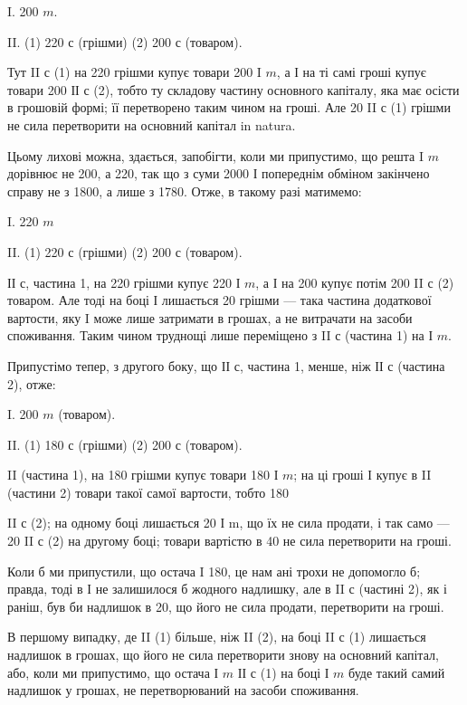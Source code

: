 
I.    200 $m$.

II. (1) 220 $с$ (грішми) \dplus{} (2) 200 $с$ (товаром).

Тут II $с$ (1) на 220 грішми купує товари 200 I $m$, а І на
ті самі гроші купує товари 200 ІІ $с$ (2), тобто ту складову частину
основного капіталу, яка має осісти в грошовій формі; її перетворено
таким чином на гроші. Але 20 II $с$ (1) грішми не сила перетворити на
основний капітал in natura.

Цьому лихові можна, здається, запобігти, коли ми припустимо, що решта
I $m$ дорівнює не 200, а 220, так що з суми 2000 І попереднім обміном закінчено
справу не з 1800, а лише з 1780. Отже, в такому разі матимемо:

I.    220 $m$

II. (1) 220 $с$ (грішми) \dplus{} (2) 200 $с$ (товаром).

ІІ $с$, частина 1, на 220 грішми купує 220 І $m$, а І на
200 купує потім 200 II $с$ (2) товаром. Але тоді на боці І
лишається 20 грішми — така частина додаткової вартости, яку
I може лише затримати в грошах, а не витрачати на засоби споживання.
Таким чином труднощі лише переміщено з II $с$ (частина 1) на І $m$.

Припустімо тепер, з другого боку, що ІІ $с$, частина 1, менше, ніж ІІ $с$
(частина 2), отже:


I.    200 $m$ (товаром).

II. (1) 180 $с$ (грішми) \dplus{} (2) 200 $с$ (товаром).

II (частина 1), на 180 грішми купує товари 180 І $m$; на ці
гроші І купує в II (частини 2) товари такої самої вартости, тобто 180

II    $с$ (2); на одному боці лишається 20 І m, що їх не сила продати, і так
само — 20 II с (2) на другому боці; товари вартістю в 40 не сила перетворити
на гроші.

Коли б ми припустили, що остача I \deq{} 180, це нам ані трохи не допомогло
б; правда, тоді в І не залишилося б жодного надлишку, але в II $с$
(частині 2), як і раніш, був би надлишок в 20, що його не сила продати,
перетворити на гроші.

В першому випадку, де II (1) більше, ніж II (2), на боці II $с$ (1)
лишається надлишок в грошах, що його не сила перетворити знову на
основний капітал, або, коли ми припустимо, що остача І $m$ \deq{} ІІ $с$ (1) на
боці І $m$ буде такий самий надлишок у грошах, не перетворюваний на
засоби споживання.

